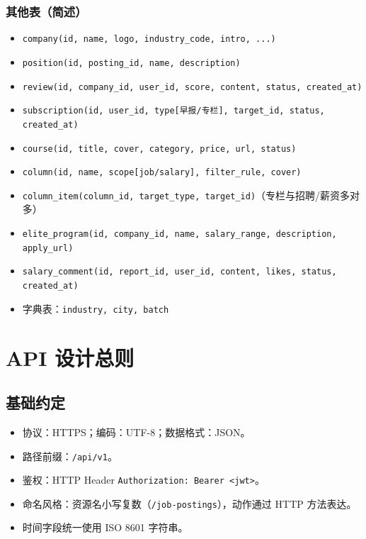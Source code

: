 \documentclass[11pt,a4paper]{ctexart}
\begin{document}
\subsubsection{其他表（简述）}
\begin{itemize}[leftmargin=2em]
    \item \texttt{company(id, name, logo, industry\_code, intro, ...)}
    \item \texttt{position(id, posting\_id, name, description)}
    \item \texttt{review(id, company\_id, user\_id, score, content, status, created\_at)}
    \item \texttt{subscription(id, user\_id, type[早报/专栏], target\_id, status, created\_at)}
    \item \texttt{course(id, title, cover, category, price, url, status)}
    \item \texttt{column(id, name, scope[job/salary], filter\_rule, cover)}
    \item \texttt{column\_item(column\_id, target\_type, target\_id)}（专栏与招聘/薪资多对多）
    \item \texttt{elite\_program(id, company\_id, name, salary\_range, description, apply\_url)}
    \item \texttt{salary\_comment(id, report\_id, user\_id, content, likes, status, created\_at)}
    \item 字典表：\texttt{industry, city, batch}
\end{itemize}

\section{API 设计总则}

\subsection{基础约定}
\begin{itemize}[leftmargin=2em]
    \item 协议：HTTPS；编码：UTF-8；数据格式：JSON。
    \item 路径前缀：\texttt{/api/v1}。
    \item 鉴权：HTTP Header \texttt{Authorization: Bearer <jwt>}。
    \item 命名风格：资源名小写复数（\texttt{/job-postings}），动作通过 HTTP 方法表达。
    \item 时间字段统一使用 ISO 8601 字符串。
\end{itemize}
\end{document}
